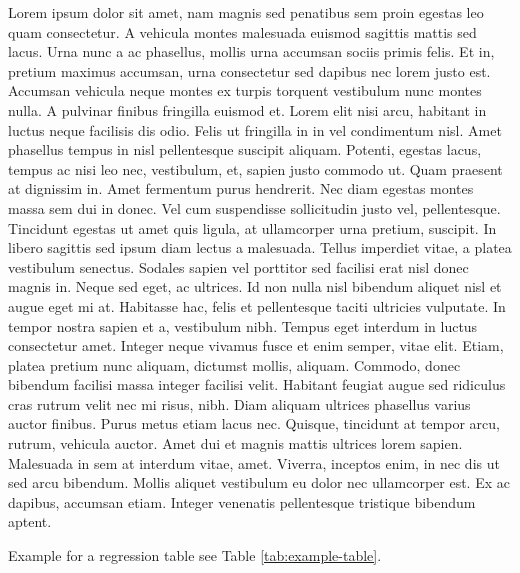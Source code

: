 \documentclass[
  12pt,
]{article}
\begin{document}
Lorem ipsum dolor sit amet, nam magnis sed penatibus sem proin egestas leo quam consectetur. A vehicula montes malesuada euismod sagittis mattis sed lacus. Urna nunc a ac phasellus, mollis urna accumsan sociis primis felis. Et in, pretium maximus accumsan, urna consectetur sed dapibus nec lorem justo est. Accumsan vehicula neque montes ex turpis torquent vestibulum nunc montes nulla. A pulvinar finibus fringilla euismod et. Lorem elit nisi arcu, habitant in luctus neque facilisis dis odio. Felis ut fringilla in in vel condimentum nisl. Amet phasellus tempus in nisl pellentesque suscipit aliquam. Potenti, egestas lacus, tempus ac nisi leo nec, vestibulum, et, sapien justo commodo ut. Quam praesent at dignissim in. Amet fermentum purus hendrerit. Nec diam egestas montes massa sem dui in donec. Vel cum suspendisse sollicitudin justo vel, pellentesque. Tincidunt egestas ut amet quis ligula, at ullamcorper urna pretium, suscipit. In libero sagittis sed ipsum diam lectus a malesuada. Tellus imperdiet vitae, a platea vestibulum senectus. Sodales sapien vel porttitor sed facilisi erat nisl donec magnis in. Neque sed eget, ac ultrices. Id non nulla nisl bibendum aliquet nisl et augue eget mi at. Habitasse hac, felis et pellentesque taciti ultricies vulputate. In tempor nostra sapien et a, vestibulum nibh. Tempus eget interdum in luctus consectetur amet. Integer neque vivamus fusce et enim semper, vitae elit. Etiam, platea pretium nunc aliquam, dictumst mollis, aliquam. Commodo, donec bibendum facilisi massa integer facilisi velit. Habitant feugiat augue sed ridiculus cras rutrum velit nec mi risus, nibh. Diam aliquam ultrices phasellus varius auctor finibus. Purus metus etiam lacus nec. Quisque, tincidunt at tempor arcu, rutrum, vehicula auctor. Amet dui et magnis mattis ultrices lorem sapien. Malesuada in sem at interdum vitae, amet. Viverra, inceptos enim, in nec dis ut sed arcu bibendum. Mollis aliquet vestibulum eu dolor nec ullamcorper est. Ex ac dapibus, accumsan etiam. Integer venenatis pellentesque tristique bibendum aptent.

Example for a regression table see Table \ref{tab:example-table}.
\end{document}
